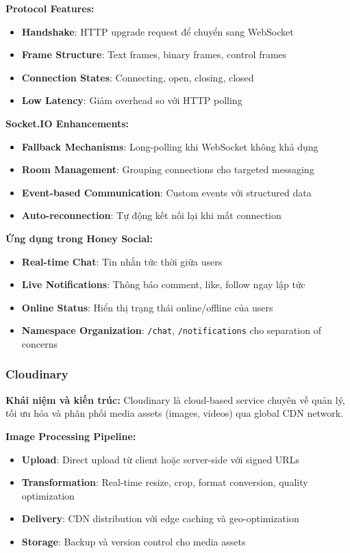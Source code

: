 \textbf{Protocol Features:}
\begin{itemize}
\item \textbf{Handshake}: HTTP upgrade request để chuyển sang WebSocket
\item \textbf{Frame Structure}: Text frames, binary frames, control frames
\item \textbf{Connection States}: Connecting, open, closing, closed
\item \textbf{Low Latency}: Giảm overhead so với HTTP polling
\end{itemize}

\textbf{Socket.IO Enhancements:}
\begin{itemize}
\item \textbf{Fallback Mechanisms}: Long-polling khi WebSocket không khả dụng
\item \textbf{Room Management}: Grouping connections cho targeted messaging
\item \textbf{Event-based Communication}: Custom events với structured data
\item \textbf{Auto-reconnection}: Tự động kết nối lại khi mất connection
\end{itemize}

\textbf{Ứng dụng trong Honey Social:}
\begin{itemize}
\item \textbf{Real-time Chat}: Tin nhắn tức thời giữa users
\item \textbf{Live Notifications}: Thông báo comment, like, follow ngay lập tức
\item \textbf{Online Status}: Hiển thị trạng thái online/offline của users
\item \textbf{Namespace Organization}: \texttt{/chat}, \texttt{/notifications} cho separation of concerns
\end{itemize}

\subsubsection{Cloudinary}
\textbf{Khái niệm và kiến trúc:}
Cloudinary là cloud-based service chuyên về quản lý, tối ưu hóa và phân phối media assets (images, videos) qua global CDN network.

\textbf{Image Processing Pipeline:}
\begin{itemize}
\item \textbf{Upload}: Direct upload từ client hoặc server-side với signed URLs
\item \textbf{Transformation}: Real-time resize, crop, format conversion, quality optimization
\item \textbf{Delivery}: CDN distribution với edge caching và geo-optimization
\item \textbf{Storage}: Backup và version control cho media assets
\end{itemize}

